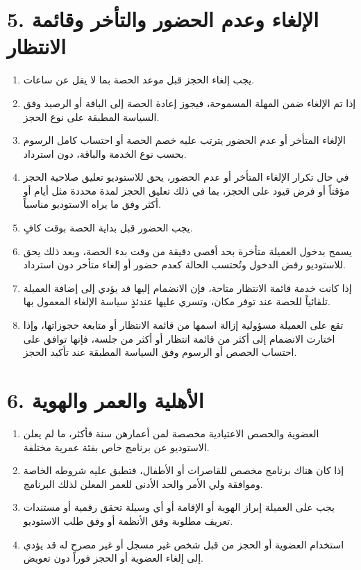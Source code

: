 \documentclass[12pt,a4paper]{article}
\newcommand{\engnum}[1]{\textLR{#1}}
\begin{document}
\section*{5. الإلغاء وعدم الحضور والتأخر وقائمة الانتظار}
\begin{enumerate}
    \item يجب إلغاء الحجز قبل موعد الحصة بما لا يقل عن \engnum{6} ساعات.
    \item إذا تم الإلغاء ضمن المهلة المسموحة، فيجوز إعادة الحصة إلى الباقة أو الرصيد وفق السياسة المطبقة على نوع الحجز.
    \item الإلغاء المتأخر أو عدم الحضور يترتب عليه خصم الحصة أو احتساب كامل الرسوم بحسب نوع الخدمة والباقة، دون استرداد.
    \item في حال تكرار الإلغاء المتأخر أو عدم الحضور، يحق للاستوديو تعليق صلاحية الحجز مؤقتاً أو فرض قيود على الحجز، بما في ذلك تعليق الحجز لمدة محددة مثل \engnum{3} أيام أو أكثر وفق ما يراه الاستوديو مناسباً.
    \item يجب الحضور قبل بداية الحصة بوقت كافٍ.
    \item يسمح بدخول العميلة متأخرة بحد أقصى \engnum{15} دقيقة من وقت بدء الحصة، وبعد ذلك يحق للاستوديو رفض الدخول وتُحتسب الحالة كعدم حضور أو إلغاء متأخر دون استرداد.
    \item إذا كانت خدمة قائمة الانتظار متاحة، فإن الانضمام إليها قد يؤدي إلى إضافة العميلة تلقائياً للحصة عند توفر مكان، وتسري عليها عندئذٍ سياسة الإلغاء المعمول بها.
    \item تقع على العميلة مسؤولية إزالة اسمها من قائمة الانتظار أو متابعة حجوزاتها، وإذا اختارت الانضمام إلى أكثر من قائمة انتظار أو أكثر من جلسة، فإنها توافق على احتساب الحصص أو الرسوم وفق السياسة المطبقة عند تأكيد الحجز.
\end{enumerate}

\section*{6. الأهلية والعمر والهوية}
\begin{enumerate}
    \item العضوية والحصص الاعتيادية مخصصة لمن أعمارهن \engnum{16} سنة فأكثر، ما لم يعلن الاستوديو عن برنامج خاص بفئة عمرية مختلفة.
    \item إذا كان هناك برنامج مخصص للقاصرات أو الأطفال، فتطبق عليه شروطه الخاصة وموافقة ولي الأمر والحد الأدنى للعمر المعلن لذلك البرنامج.
    \item يجب على العميلة إبراز الهوية أو الإقامة أو أي وسيلة تحقق رقمية أو مستندات تعريف مطلوبة وفق الأنظمة أو وفق طلب الاستوديو.
    \item استخدام العضوية أو الحجز من قبل شخص غير مسجل أو غير مصرح له قد يؤدي إلى إلغاء العضوية أو الحجز فوراً دون تعويض.
\end{enumerate}
\end{document}
